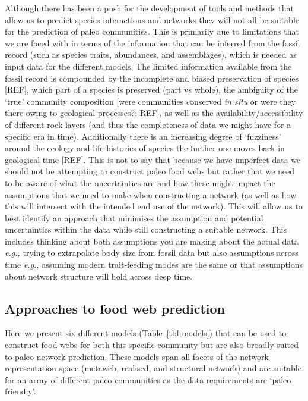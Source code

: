 \documentclass[
]{article}
\begin{document}
Although there has been a push for the development of tools and methods
that allow us to predict species interactions and networks they will not
all be suitable for the prediction of paleo communities. This is
primarily due to limitations that we are faced with in terms of the
information that can be inferred from the fossil record (such as species
traits, abundances, and assemblages), which is needed as input data for
the different models. The limited information available from the fossil
record is compounded by the incomplete and biased preservation of
species {[}REF{]}, which part of a species is preserved (part vs whole),
the ambiguity of the `true' community composition {[}were communities
conserved \emph{in situ} or were they there owing to geological
processes?; REF{]}, as well as the availability/accessibility of
different rock layers (and thus the completeness of data we might have
for a specific era in time). Additionally there is an increasing degree
of `fuzziness' around the ecology and life histories of species the
further one moves back in geological time {[}REF{]}. This is not to say
that because we have imperfect data we should not be attempting to
construct paleo food webs but rather that we need to be aware of what
the uncertainties are and how these might impact the assumptions that we
need to make when constructing a network (as well as how this will
intersect with the intended end use of the network). This will allow us
to best identify an approach that minimises the assumption and potential
uncertainties within the data while still constructing a suitable
network. This includes thinking about both assumptions you are making
about the actual data \emph{e.g.,} trying to extrapolate body size from
fossil data but also assumptions across time \emph{e.g.,} assuming
modern trait-feeding modes are the same or that assumptions about
network structure will hold across deep time.

\subsection{Approaches to food web
prediction}\label{approaches-to-food-web-prediction}

Here we present six different models (Table~\ref{tbl-models}) that can
be used to construct food webs for both this specific community but are
also broadly suited to paleo network prediction. These models span all
facets of the network representation space (metaweb, realised, and
structural network) and are suitable for an array of different paleo
communities as the data requirements are `paleo friendly'.
\end{document}
